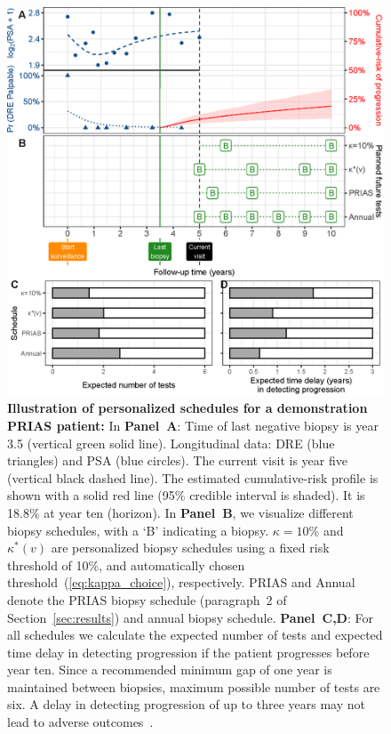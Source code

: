 \begin{figure}
\centerline{\includegraphics{images/demo_schedule.eps}}
\caption{\textbf{Illustration of personalized schedules for a demonstration PRIAS patient:} In \textbf{Panel~A}: Time of last negative biopsy is year 3.5 (vertical green solid line). Longitudinal data: DRE (blue triangles) and PSA (blue circles). The current visit is year five (vertical black dashed line). The estimated cumulative-risk profile is shown with a solid red line (95\% credible interval is shaded). It is 18.8\% at year ten (horizon). In \textbf{Panel~B}, we visualize different biopsy schedules, with a `B' indicating a biopsy. \textbf{$\kappa=10\%$} and \textbf{$\kappa^*(v)$} are personalized biopsy schedules using a fixed risk threshold of 10\%, and automatically chosen threshold~(\ref{eq:kappa_choice}), respectively. PRIAS and Annual denote the PRIAS biopsy schedule (paragraph~2 of Section~\ref{sec:results}) and annual biopsy schedule. \textbf{Panel~C,D}: For all schedules we calculate the expected number of tests and expected time delay in detecting progression if the patient progresses before year ten. Since a recommended minimum gap of one year is maintained between biopsies, maximum possible number of tests are six.  A delay in detecting progression of up to three years may not lead to adverse outcomes~\citep{carvalho}. }\label{fig:demo_schedule}
\end{figure}